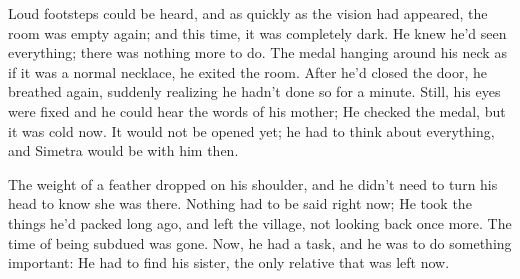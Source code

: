 Loud footsteps could be heard, and as quickly as the vision had appeared, the room was empty again; and this time, it was completely dark. He knew he'd seen everything; there was nothing more to do. The medal hanging around his neck as if it was a normal necklace, he exited the room. After he'd closed the door, he breathed again, suddenly realizing he hadn't done so for a minute. Still, his eyes were fixed and he could hear the words of his mother; He checked the medal, but it was cold now. It would not be opened yet; he had to think about everything, and Simetra would be with him then.

The weight of a feather dropped on his shoulder, and he didn't need to turn his head to know she was there. 
Nothing had to be said right now; He took the things he'd packed long ago, and left the village, not looking back once more. 
The time of being subdued was gone. Now, he had a task, and he was to do something important: He had to find his sister, the only relative that was left now. 

